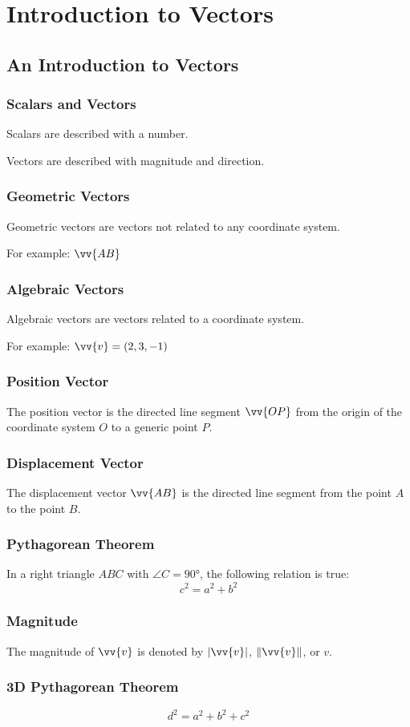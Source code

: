 \chapter{Introduction to Vectors}
	\section{An Introduction to Vectors}
		\subsection{Scalars and Vectors}
			Scalars are described with a number.

			Vectors are described with magnitude and direction.
		\subsection{Geometric Vectors}
			Geometric vectors are vectors not related to any coordinate system.

			For example: $\vv{AB}$
		\subsection{Algebraic Vectors}
			Algebraic vectors are vectors related to a coordinate system.

			For example: $\vv{v} = (2, 3, -1)$
		\subsection{Position Vector}
			The position vector is the directed line segment $\vv{OP}$ from the origin of the coordinate system $O$ to a generic point $P$.
		\subsection{Displacement Vector}
			The displacement vector $\vv{AB}$ is the directed line segment from the point $A$ to the point $B$.
		\subsection{Pythagorean Theorem}
			In a right triangle $ABC$ with $\angle C = \ang{90}$, the following relation is true:
			\[c^2 = a^2 + b^2\]
		\subsection{Magnitude}
			The magnitude of $\vv{v}$ is denoted by $|\vv{v}|$, $\|\vv{v}\|$, or $v$.
		\subsection{3D Pythagorean Theorem}
			\[d^2 = a^2 + b^2 + c^2\]
